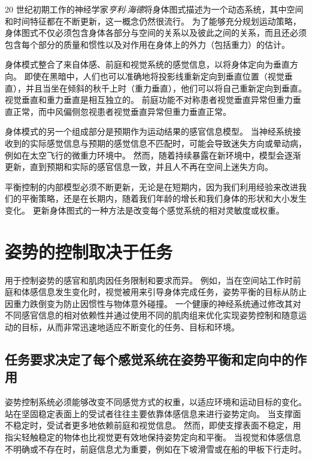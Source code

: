 20 世纪初期工作的神经学家\textit{亨利$\cdot$海德}将身体图式描述为一个动态系统，其中空间和时间特征都在不断更新，这一概念仍然很流行。
为了能够充分规划运动策略，身体图式不仅必须包含身体各部分与空间的关系以及彼此之间的关系，而且还必须包含每个部分的质量和惯性以及对作用在身体上的外力（包括重力）的估计。


身体模式整合了来自体感、前庭和视觉系统的感觉信息，以将身体定向为垂直方向。
即使在黑暗中，人们也可以准确地将投影线重新定向到垂直位置（视觉垂直），并且当坐在倾斜的秋千上时（重力垂直），他们可以将自己重新定向到垂直。
视觉垂直和重力垂直是相互独立的。
前庭功能不对称患者视觉垂直异常但重力垂直正常，而中风偏侧忽视患者视觉垂直异常但重力垂直正常。


身体模式的另一个组成部分是预期作为运动结果的感官信息模型。
当神经系统接收到的实际感觉信息与预期的感觉信息不匹配时，可能会导致迷失方向或晕动病，例如在太空飞行的微重力环境中。
然而，随着持续暴露在新环境中，模型会逐渐更新，直到预期和实际的感官信息一致，并且人不再在空间上迷失方向。


平衡控制的内部模型必须不断更新，无论是在短期内，因为我们利用经验来改进我们的平衡策略，还是在长期内，随着我们年龄的增长和我们身体的形状和大小发生变化。
更新身体图式的一种方法是改变每个感觉系统的相对灵敏度或权重。



\section{姿势的控制取决于任务}

用于控制姿势的感官和肌肉因任务限制和要求而异。
例如，当在空间站工作时前庭和体感信息发生变化时，视觉被用来引导身体完成任务，姿势平衡的目标从防止因重力跌倒变为防止因惯性与物体意外碰撞。
一个健康的神经系统通过修改其对不同感官信息的相对依赖性并通过使用不同的肌肉组来优化实现姿势控制和随意运动的目标，从而非常迅速地适应不断变化的任务、目标和环境。



\subsection{任务要求决定了每个感觉系统在姿势平衡和定向中的作用}

姿势控制系统必须能够改变不同感觉方式的权重，以适应环境和运动目标的变化。
站在坚固稳定表面上的受试者往往主要依靠体感信息来进行姿势定向。
当支撑面不稳定时，受试者更多地依赖前庭和视觉信息。
然而，即使支撑表面不稳定，用指尖轻触稳定的物体也比视觉更有效地保持姿势定向和平衡。
当视觉和体感信息不明确或不存在时，前庭信息尤为重要，例如在下坡滑雪或在船的甲板下行走时。



